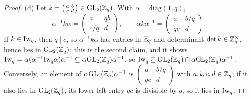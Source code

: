 \begin{proof}
(d) Let $k=\left(\begin{smallmatrix}a&b\\c&d\end{smallmatrix}\right)\in\mathrm{GL}_2(\mathbb{Z}_q)$. With $\alpha=\mathrm{diag}(1,q)$,
\[\alpha^{-1}k\alpha=\left(\begin{smallmatrix}a&qb\\c/q&d\end{smallmatrix}\right),\qquad
\alpha k\alpha^{-1}=\left(\begin{smallmatrix}a&b/q\\qc&d\end{smallmatrix}\right).\]
If $k\in\mathrm{Iw}_q$, then $q\mid c$, so $\alpha^{-1}k\alpha$ has entries in $\mathbb{Z}_q$ and determinant $\det k\in\mathbb{Z}_q^\times$, hence lies in $\mathrm{GL}_2(\mathbb{Z}_q)$; this is the
second claim, and it shows $\mathrm{Iw}_q=\alpha(\alpha^{-1}\mathrm{Iw}_q\alpha)\alpha^{-1}\subseteq\alpha\mathrm{GL}_2(\mathbb{Z}_q)\alpha^{-1}$, so $\mathrm{Iw}_q\subseteq\mathrm{GL}_2(\mathbb{Z}_q)\cap\alpha\mathrm{GL}_2(\mathbb{Z}_q)\alpha^{-1}$.
Conversely, an element of $\alpha\mathrm{GL}_2(\mathbb{Z}_q)\alpha^{-1}$ is $\left(\begin{smallmatrix}a&b/q\\qc&d\end{smallmatrix}\right)$ with $a,b,c,d\in\mathbb{Z}_q$; if it also lies in $\mathrm{GL}_2(\mathbb{Z}_q)$,
its lower left entry $qc$ is divisible by $q$, so it lies in $\mathrm{Iw}_q$.
\end{proof}

